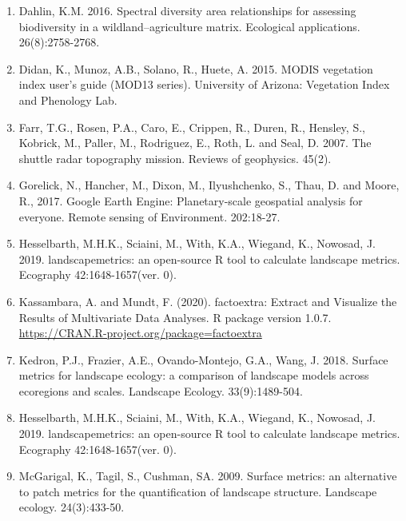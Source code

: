 \documentclass[
]{article}
\begin{document}
\begin{enumerate}
\def\labelenumi{\arabic{enumi})}
\item
  Dahlin, K.M. 2016. Spectral diversity area relationships for assessing
  biodiversity in a wildland--agriculture matrix. Ecological
  applications. 26(8):2758-2768.
\item
  Didan, K., Munoz, A.B., Solano, R., Huete, A. 2015. MODIS vegetation
  index user's guide (MOD13 series). University of Arizona: Vegetation
  Index and Phenology Lab.
\item
  Farr, T.G., Rosen, P.A., Caro, E., Crippen, R., Duren, R., Hensley,
  S., Kobrick, M., Paller, M., Rodriguez, E., Roth, L. and Seal, D.
  2007. The shuttle radar topography mission. Reviews of geophysics.
  45(2).
\item
  Gorelick, N., Hancher, M., Dixon, M., Ilyushchenko, S., Thau, D. and
  Moore, R., 2017. Google Earth Engine: Planetary-scale geospatial
  analysis for everyone. Remote sensing of Environment. 202:18-27.
\item
  Hesselbarth, M.H.K., Sciaini, M., With, K.A., Wiegand, K., Nowosad, J.
  2019. landscapemetrics: an open-source R tool to calculate landscape
  metrics. Ecography 42:1648-1657(ver. 0).
\item
  Kassambara, A. and Mundt, F. (2020). factoextra: Extract and Visualize
  the Results of Multivariate Data Analyses. R package version 1.0.7.
  \url{https://CRAN.R-project.org/package=factoextra}
\item
  Kedron, P.J., Frazier, A.E., Ovando-Montejo, G.A., Wang, J. 2018.
  Surface metrics for landscape ecology: a comparison of landscape
  models across ecoregions and scales. Landscape Ecology.
  33(9):1489-504.
\item
  Hesselbarth, M.H.K., Sciaini, M., With, K.A., Wiegand, K., Nowosad, J.
  2019. landscapemetrics: an open-source R tool to calculate landscape
  metrics. Ecography 42:1648-1657(ver. 0).
\item
  McGarigal, K., Tagil, S., Cushman, SA. 2009. Surface metrics: an
  alternative to patch metrics for the quantification of landscape
  structure. Landscape ecology. 24(3):433-50.
\end{enumerate}
\end{document}
